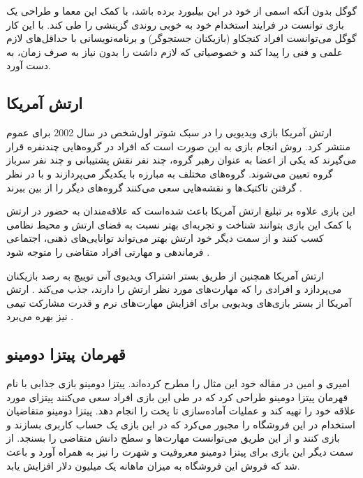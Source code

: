 گوگل بدون آنکه اسمی از خود در این بیلبورد برده باشد، با کمک این معما و طراحی یک بازی توانست در فرایند استخدام خود به خوبی روندی گزینشی را طی کند. با این کار گوگل می‌توانست افراد کنجکاو (بازیکنان جستجوگر) و برنامه‌نویسانی با حداقل‌های لازم علمی و فنی را پیدا کند و خصوصیاتی که لازم داشت را بدون نیاز به صرف زمان، به دست آورد.

\subsection{ارتش آمریکا}
ارتش آمریکا بازی ویدیویی \href{https://www.americasarmy.com/}{} را  در سبک شوتر اول‌شخص در سال 2002 برای عموم منتشر کرد. روش انجام بازی به این صورت است که افراد در گروه‌هایی چندنفره قرار می‌گیرند که یکی از اعضا به عنوان رهبر گروه، چند نفر نقش پشتیبانی و چند نفر سرباز گروه تعیین می‌شوند. گروه‌های مختلف به مبارزه با یکدیگر می‌پردازند و با در نظر گرفتن تاکتیک‌ها و نقشه‌هایی سعی می‌کنند گروه‌های دیگر را از بین ببرند \cite{eventful}.

این بازی علاوه بر تبلیغ ارتش آمریکا باعث شده‌است که علاقه‌مندان به حضور در ارتش با کمک این بازی بتوانند شناخت و تجربه‌ای بهتر نسبت به فضای ارتش و محیط نظامی کسب کنند و از سمت دیگر خود ارتش بهتر می‌تواند توانایی‌های ذهنی، اجتماعی فرماندهی و مهارتی افراد متقاضی را متوجه شود \cite{army}.

ارتش آمریکا همچنین از طریق بستر اشتراک ویدیوی آنی توییچ به رصد بازیکنان می‌پردازد و افرادی را که مهارت‌های مورد نظر ارتش را دارند، جذب می‌کند \cite{uhl, cbs}. ارتش آمریکا از بستر بازی‌های ویدیویی برای افزایش مهارت‌های نرم و قدرت مشارکت تیمی نیز بهره می‌برد \cite{cbs}.

\subsection{قهرمان پیتزا دومینو}
امیری و امین \cite{amiriamin} در مقاله خود این مثال را مطرح کرده‌اند. پیتزا دومینو بازی جذابی با نام قهرمان پیتزا دومینو طراحی کرد که در طی این بازی افراد سعی می‌کنند پیتزای مورد علاقه خود را تهیه کند و عملیات آماده‌سازی تا پخت را انجام دهد. پیتزا دومینو متقاضیان استخدام در این فروشگاه را مجبور می‌کرد که در این بازی یک حساب کاربری بسازند و بازی کنند و از این طریق می‌توانست مهارت‌ها و سطح دانش متقاضی را بسنجد. از سمت دیگر این بازی برای پیتزا دومینو معروفیت و شهرت را نیز به همراه آورد و باعث شد که فروش این فروشگاه به میزان ماهانه یک میلیون دلار افزایش یابد.

